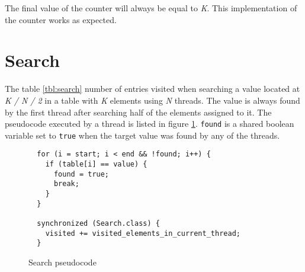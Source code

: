 \documentclass[12pt]{article}
\begin{document}
The final value of the counter will always be equal to \emph{K}. This
implementation of the counter works as expected.


\section{Search}

\begin{table}[h!]
  \centering
  \small

  \caption{Number of visited entries for variable N and K = 100.000.000 on a 4 logical
  cores processor. Reported values are averaged over 7 runs.}
  \label{tbl:search}
\end{table}

The table \ref{tbl:search} number of entries visited when searching a value
located at \emph{K / N / 2} in a table with \emph{K} elements using \emph{N}
threads. The value is always found by the first thread after searching half of
the elements assigned to it. The pseudocode executed by a thread is
listed in figure \ref{fig:search-pseudocode}. \texttt{found} is a shared
boolean variable set to \texttt{true} when the target value was
found by any of the threads.

\begin{figure}[h!]
  \begin{verbatim}
  for (i = start; i < end && !found; i++) {                                    
    if (table[i] == value) {                                                   
      found = true;                                                            
      break;                                                                   
    }                                                                          
  }                                                                            
                                                                               
  synchronized (Search.class) {                                                
    visited += visited_elements_in_current_thread;
  }
  \end{verbatim}
  \caption{Search pseudocode}
  \label{fig:search-pseudocode}
\end{figure}
\end{document}
